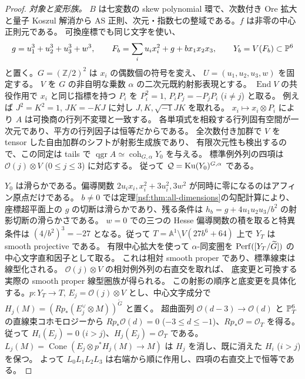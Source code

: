 \begin{proof}
\emph{対象と変形族。}
$B$ は七変数の skew polynomial 環で、次数付き Ore 拡大と量子 Koszul
解消から AS 正則、次元・指数七の整域である。$f$ は非零の中心正則元である。
可換座標でも同じ文字を使い、
\[
 g=u_1^3+u_2^3+u_3^3+w^3,\qquad
 F_b=\sum_i u_i x_i^2+g+b x_1x_2x_3,\qquad Y_b=V(F_b)\subset\mathbb P^6
\]
と置く。$G=(\mathbb Z/2)^2$ は $x_i$ の偶数個の符号を変え、
$U=(u_1,u_2,u_3,w)$ を固定する。
$V$ を $G$ の非自明な乗数 $\alpha$ の二次元既約射影表現とする。
$\operatorname{End}V$ の共役作用で $x_i$ と同じ指標を持つ
$P_i$ を $P_i^2=1$, $P_iP_j=-P_jP_i$ ($i\ne j$) と取る。
例えば $J^2=K^2=1$, $JK=-KJ$ に対し $J,K,\sqrt{-1}JK$ を取れる。
$x_i\mapsto x_i\otimes P_i$ により $A$ は可換商の行列不変環と一致する。
各単項式を相殺する行列固有空間が一次元であり、平方の行列因子は恒等だからである。
全次数付き加群で $V$ を tensor した自由加群のシフトが射影生成族であり、
有限次元性も検出するので、この同定は tails で
$\operatorname{qgr}A\simeq\operatorname{coh}_{G,\alpha}Y_0$ を与える。
標準例外列の四項は $\mathcal O(j)\otimes V$ ($0\le j\le3$) に対応する。
従って $\mathcal Q=\operatorname{Ku}(Y_0)^{G,\alpha}$ である。

$Y_0$ は滑らかである。偏導関数 $2u_i x_i,x_i^2+3u_i^2,3w^2$
が同時に零になるのはアフィン原点だけである。
$b\ne0$ では定理\ref{nsf:thm:all-dimensions}の勾配計算により、
座標超平面上の $g$ の切断は滑らかであり、残る条件は
$h_b=g+4u_1u_2u_3/b^2$ の射影切断の滑らかさである。
$w=0$ での三つの Hesse 偏導関数の積を取ると特異条件は
$(4/b^2)^3=-27$ となる。従って
$T=\mathbb A^1\setminus V(27b^6+64)$ 上で $Y_T$ は smooth projective である。
有限中心拡大を使って $\alpha$-同変圏を
$\operatorname{Perf}([Y_T/\widetilde G])$ の中心文字直和因子として取る。
これは相対 smooth proper であり、標準線束は線型化される。
$\mathcal O(j)\otimes V$ の相対例外列の右直交を取れば、
底変更と可換する実際の smooth proper 線型圏族が得られる。
この射影の順序と底変更を具体化する。$p:Y_T\to T$,
$E_j=\mathcal O(j)\otimes V$ とし、中心文字成分で
$H_j(M)=(Rp_*(E_j^\vee\otimes M))^{\widetilde G}$ と置く。
超曲面列 $\mathcal O(d-3)\to\mathcal O(d)$ と
$\mathbb P^6_T$ の直線束コホモロジーから $Rp_*\mathcal O(d)=0$
($-3\le d\le-1$)、$Rp_*\mathcal O=\mathcal O_T$ を得る。
従って $H_i(E_j)=0$ ($i>j$)、$H_j(E_j)=\mathcal O_T$ である。
$L_j(M)=\operatorname{Cone}(E_j\otimes p^*H_j(M)\to M)$ は
$H_j$ を消し、既に消えた $H_i$ ($i>j$) を保つ。
よって $L_0L_1L_2L_3$ は右端から順に作用し、四項の右直交上で恒等である。


\end{proof}
